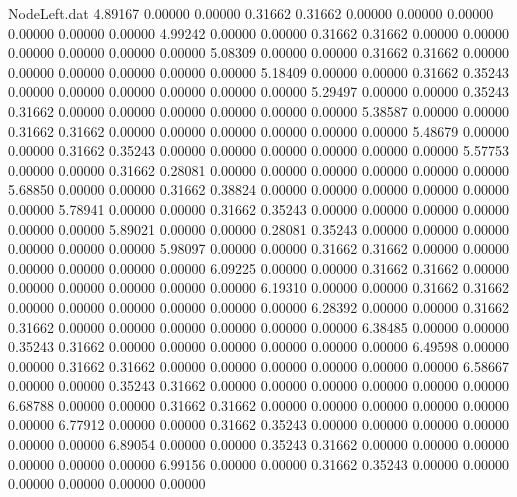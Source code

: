 \begin{filecontents}{NodeLeft.dat}
   4.89167    0.00000    0.00000     0.31662    0.31662    0.00000    0.00000    0.00000    0.00000    0.00000    0.00000
   4.99242    0.00000    0.00000     0.31662    0.31662    0.00000    0.00000    0.00000    0.00000    0.00000    0.00000
   5.08309    0.00000    0.00000     0.31662    0.31662    0.00000    0.00000    0.00000    0.00000    0.00000    0.00000
   5.18409    0.00000    0.00000     0.31662    0.35243    0.00000    0.00000    0.00000    0.00000    0.00000    0.00000
   5.29497    0.00000    0.00000     0.35243    0.31662    0.00000    0.00000    0.00000    0.00000    0.00000    0.00000
   5.38587    0.00000    0.00000     0.31662    0.31662    0.00000    0.00000    0.00000    0.00000    0.00000    0.00000
   5.48679    0.00000    0.00000     0.31662    0.35243    0.00000    0.00000    0.00000    0.00000    0.00000    0.00000
   5.57753    0.00000    0.00000     0.31662    0.28081    0.00000    0.00000    0.00000    0.00000    0.00000    0.00000
   5.68850    0.00000    0.00000     0.31662    0.38824    0.00000    0.00000    0.00000    0.00000    0.00000    0.00000
   5.78941    0.00000    0.00000     0.31662    0.35243    0.00000    0.00000    0.00000    0.00000    0.00000    0.00000
   5.89021    0.00000    0.00000     0.28081    0.35243    0.00000    0.00000    0.00000    0.00000    0.00000    0.00000
   5.98097    0.00000    0.00000     0.31662    0.31662    0.00000    0.00000    0.00000    0.00000    0.00000    0.00000
   6.09225    0.00000    0.00000     0.31662    0.31662    0.00000    0.00000    0.00000    0.00000    0.00000    0.00000
   6.19310    0.00000    0.00000     0.31662    0.31662    0.00000    0.00000    0.00000    0.00000    0.00000    0.00000
   6.28392    0.00000    0.00000     0.31662    0.31662    0.00000    0.00000    0.00000    0.00000    0.00000    0.00000
   6.38485    0.00000    0.00000     0.35243    0.31662    0.00000    0.00000    0.00000    0.00000    0.00000    0.00000
   6.49598    0.00000    0.00000     0.31662    0.31662    0.00000    0.00000    0.00000    0.00000    0.00000    0.00000
   6.58667    0.00000    0.00000     0.35243    0.31662    0.00000    0.00000    0.00000    0.00000    0.00000    0.00000
   6.68788    0.00000    0.00000     0.31662    0.31662    0.00000    0.00000    0.00000    0.00000    0.00000    0.00000
   6.77912    0.00000    0.00000     0.31662    0.35243    0.00000    0.00000    0.00000    0.00000    0.00000    0.00000
   6.89054    0.00000    0.00000     0.35243    0.31662    0.00000    0.00000    0.00000    0.00000    0.00000    0.00000
   6.99156    0.00000    0.00000     0.31662    0.35243    0.00000    0.00000    0.00000    0.00000    0.00000    0.00000

\end{filecontents}
